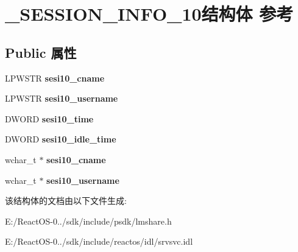 \hypertarget{struct___s_e_s_s_i_o_n___i_n_f_o__10}{}\section{\+\_\+\+S\+E\+S\+S\+I\+O\+N\+\_\+\+I\+N\+F\+O\+\_\+10结构体 参考}
\label{struct___s_e_s_s_i_o_n___i_n_f_o__10}
\subsection*{Public 属性}
\begin{DoxyCompactItemize}
\item 
\mbox{\label{struct___s_e_s_s_i_o_n___i_n_f_o__10_abaf7a2f7a58f7e6e4e55656e701a59b9}} 
L\+P\+W\+S\+TR {\bfseries sesi10\+\_\+cname}
\item 
\mbox{\label{struct___s_e_s_s_i_o_n___i_n_f_o__10_aaf3d464955706bf3725187ef14cc9b04}} 
L\+P\+W\+S\+TR {\bfseries sesi10\+\_\+username}
\item 
\mbox{\label{struct___s_e_s_s_i_o_n___i_n_f_o__10_a7d2b4f0b8052f33a48e4d07eeff5bc4f}} 
D\+W\+O\+RD {\bfseries sesi10\+\_\+time}
\item 
\mbox{\label{struct___s_e_s_s_i_o_n___i_n_f_o__10_a751f9719cf3c04ac37590114bf54c93f}} 
D\+W\+O\+RD {\bfseries sesi10\+\_\+idle\+\_\+time}
\item 
\mbox{\label{struct___s_e_s_s_i_o_n___i_n_f_o__10_abc88326653bd8b96867fa9ae3c3c0af9}} 
wchar\+\_\+t $\ast$ {\bfseries sesi10\+\_\+cname}
\item 
\mbox{\label{struct___s_e_s_s_i_o_n___i_n_f_o__10_ac6efb121c9003b3054f23e8a0b64b8af}} 
wchar\+\_\+t $\ast$ {\bfseries sesi10\+\_\+username}
\end{DoxyCompactItemize}


该结构体的文档由以下文件生成\+:\begin{DoxyCompactItemize}
\item 
E\+:/\+React\+O\+S-\/0../sdk/include/psdk/lmshare.\+h\item 
E\+:/\+React\+O\+S-\/0../sdk/include/reactos/idl/srvsvc.\+idl\end{DoxyCompactItemize}
